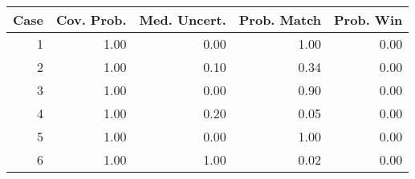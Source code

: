 \begin{tabular}{|r|rrrr|}
  \hline
Case & Cov. Prob. & Med. Uncert. & Prob. Match & Prob. Win \\ 
  \hline
1 & 1.00 & 0.00 & 1.00 & 0.00 \\ 
  2 & 1.00 & 0.10 & 0.34 & 0.00 \\ 
  3 & 1.00 & 0.00 & 0.90 & 0.00 \\ 
  4 & 1.00 & 0.20 & 0.05 & 0.00 \\ 
  5 & 1.00 & 0.00 & 1.00 & 0.00 \\ 
  6 & 1.00 & 1.00 & 0.02 & 0.00 \\ 
   \hline
\end{tabular}
